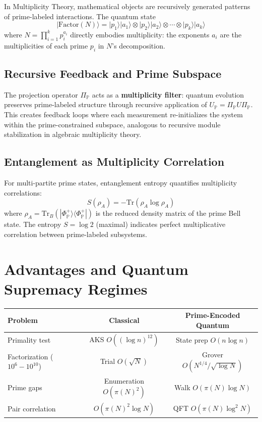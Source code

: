 \documentclass[11pt,letterpaper]{article}
\begin{document}
In Multiplicity Theory, mathematical objects are recursively generated patterns of prime-labeled interactions. The quantum state
\[
|\text{Factor}(N)\rangle = |p_1\rangle|a_1\rangle \otimes |p_2\rangle|a_2\rangle \otimes \cdots \otimes |p_k\rangle|a_k\rangle
\]
where $N = \prod_{i=1}^k p_i^{a_i}$ directly embodies multiplicity: the exponents $a_i$ are the multiplicities of each prime $p_i$ in $N$'s decomposition.

\subsection{Recursive Feedback and Prime Subspace}

The projection operator $\Pi_{\mathbb{P}}$ acts as a \textbf{multiplicity filter}: quantum evolution preserves prime-labeled structure through recursive application of $U_{\mathbb{P}} = \Pi_{\mathbb{P}} U \Pi_{\mathbb{P}}$. This creates feedback loops where each measurement re-initializes the system within the prime-constrained subspace, analogous to recursive module stabilization in algebraic multiplicity theory.

\subsection{Entanglement as Multiplicity Correlation}

For multi-partite prime states, entanglement entropy quantifies multiplicity correlations:
\[
S(\rho_A) = -\text{Tr}(\rho_A \log \rho_A)
\]
where $\rho_A = \text{Tr}_B(|\Phi^+_{\mathbb{P}}\rangle\langle\Phi^+_{\mathbb{P}}|)$ is the reduced density matrix of the prime Bell state. The entropy $S = \log 2$ (maximal) indicates perfect multiplicative correlation between prime-labeled subsystems.

\section{Advantages and Quantum Supremacy Regimes}

\begin{center}
\begin{tabular}{lcc}
\hline
\textbf{Problem} & \textbf{Classical} & \textbf{Prime-Encoded Quantum} \\
\hline
Primality test & AKS $O((\log n)^{12})$ & State prep $O(n\log n)$ \\
Factorization ($10^6{-}10^{10}$) & Trial $O(\sqrt{N})$ & Grover $O(N^{1/4}/\sqrt{\log N})$ \\
Prime gaps & Enumeration $O(\pi(N)^2)$ & Walk $O(\pi(N)\log N)$ \\
Pair correlation & $O(\pi(N)^2\log N)$ & QFT $O(\pi(N)\log^2 N)$ \\
\hline
\end{tabular}
\end{center}
\end{document}

